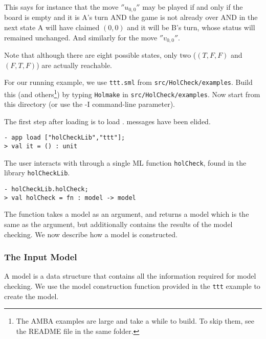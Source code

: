 This says for instance that the move \(''{u_{0,0}}''\) may be played if and only if the board is empty and it is A's turn AND the game is not already over AND in the next state A will have claimed \((0,0)\) and it will be B's turn, whose status will remained unchanged. And similarly for the move \(''{v_{0,0}}''\).

Note that although there are eight possible states, only two (\((T,F,F)\) and \((F,T,F) \)) are actually reachable.

For our running example, we use \texttt{ttt.sml} from \texttt{src/HolCheck/examples}. Build this (and others\footnote{The AMBA examples are large and take a while to build. To skip them, see the README file in the same folder.}) by typing \texttt{Holmake} in \texttt{src/HolCheck/examples}. Now start \HOL{} from this directory (or use the -I command-line parameter).

The first step after loading \HOL{} is to load \hc{}. \HOL{} messages have been elided.

\setcounter{sessioncount}{0}

\begin{session}\begin{verbatim}
- app load ["holCheckLib","ttt"];
> val it = () : unit
\end{verbatim}\end{session}

The user interacts with \hc{} through a single ML function \texttt{holCheck}, found in the library \texttt{holCheckLib}.

\begin{session}\begin{verbatim}
- holCheckLib.holCheck;
> val holCheck = fn : model -> model
\end{verbatim}\end{session}

The function takes a \hc{} model as an argument, and returns a model which is the same as the argument, but additionally contains the results of the model checking. We now describe how a \hc{} model is constructed.

\subsubsection{The Input Model}

A \hc{} model is a data structure that contains all the information required for model checking. We use the model construction function provided in the \texttt{ttt} example to create the model.

